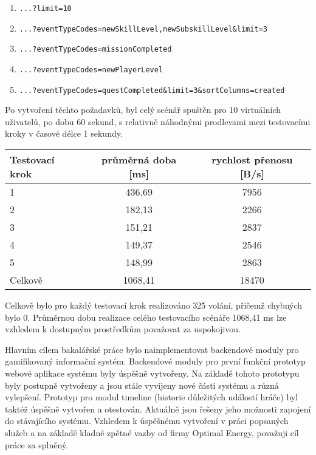 \documentclass[twoside, 12pt]{article}
\begin{document}
{{

\begin{enumerate}
\item \texttt{...?limit=10}
\item \texttt{...?eventTypeCodes=newSkillLevel,newSubskillLevel\&limit=3}
\item \texttt{...?eventTypeCodes=missionCompleted}
\item \texttt{...?eventTypeCodes=newPlayerLevel}
\item \texttt{...?eventTypeCodes=questCompleted\&limit=3\&sortColumns=created}
\end{enumerate}

\clearpage

Po vytvoření těchto požadavků, byl celý scénář spuštěn pro 10 virtuálních uživatelů,
po dobu 60 sekund, s relativně náhodnými prodlevami mezi testovacími kroky v časové délce 1 sekundy.

\vspace{10}


\def\arraystretch{1.2}
\begin{tabular}{|l|c|c|}
\hline
\textbf{Testovací krok} & \textbf{průměrná doba [ms]} & \textbf{rychlost přenosu [B/s]} \\
\hline
1 & 436,69 & 7956 \\
\hline
2 & 182,13 & 2266 \\
\hline
3 & 151,21 & 2837 \\
\hline
4 & 149,37 & 2546 \\
\hline
5 & 148,99 & 2863 \\
\hline
Celkově & 1068,41 & 18470 \\
\hline
\end{tabular}
\endtab

Celkově bylo pro každý testovací krok realizováno 325 volání, přičemž chybných bylo 0.
Průměrnou dobu realizace celého testovacího scénáře 1068,41 ms lze vzhledem k dostupným prostředkům
považovat za uspokojivou.

Hlavním cílem bakalářské práce bylo naimplementovat backendové moduly pro gamifikovaný informační systém.
Backendové moduly pro první funkční prototyp webové aplikace systému byly
úspěšně vytvořeny.
Na základě tohoto prototypu byly postupně vytvořeny
a jsou stále vyvíjeny nové části systému a různá vylepšení.
Prototyp pro modul timeline (historie důležitých událostí hráče) byl taktéž úspěšně vytvořen
a otestován. Aktuálně jsou řešeny jeho možnosti zapojení do stávajícího systému.
Vzhledem k úspěšnému vytvoření v práci popsaných služeb a na základě kladné zpětné vazby od firmy Optimal Energy,
považuji cíl práce za splněný.


}}
\end{document}
